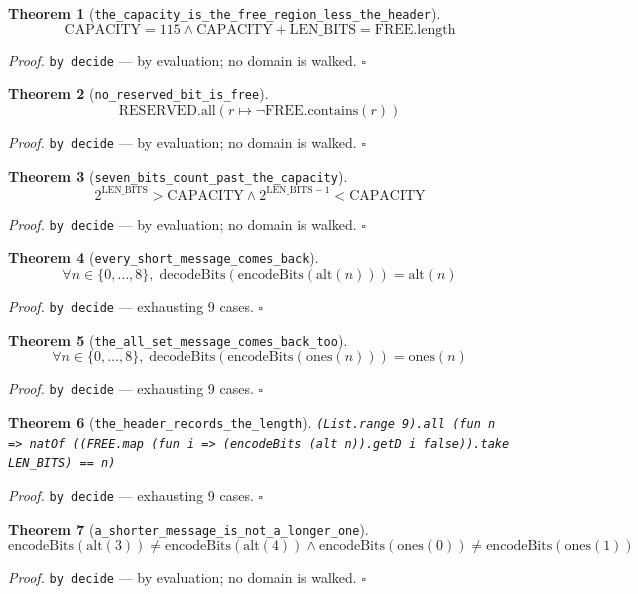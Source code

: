 \documentclass[11pt]{article}
\newtheorem{theorem}{Theorem}[section]
\begin{document}
\begin{theorem}[\texttt{the\_capacity\_is\_the\_free\_region\_less\_the\_header}]
\[ \mathrm{CAPACITY} = 115 \land \mathrm{CAPACITY} + \mathrm{LEN\_BITS} = \mathrm{FREE.length} \]
\end{theorem}
\noindent\emph{Proof.} \texttt{by decide} --- by evaluation; no domain is walked. \hfill$\square$

\begin{theorem}[\texttt{no\_reserved\_bit\_is\_free}]
\[ \mathrm{RESERVED.all}\mathopen{}\left(r \mapsto \lnot \mathrm{FREE.contains}\mathopen{}\left(r\right)\right) \]
\end{theorem}
\noindent\emph{Proof.} \texttt{by decide} --- by evaluation; no domain is walked. \hfill$\square$

\begin{theorem}[\texttt{seven\_bits\_count\_past\_the\_capacity}]
\[ 2^{\mathrm{LEN\_BITS}} > \mathrm{CAPACITY} \land 2^{\mathrm{LEN\_BITS} - 1} < \mathrm{CAPACITY} \]
\end{theorem}
\noindent\emph{Proof.} \texttt{by decide} --- by evaluation; no domain is walked. \hfill$\square$

\begin{theorem}[\texttt{every\_short\_message\_comes\_back}]
\[ \forall n \in \{0,\dots,8\},\; \mathrm{decodeBits}\mathopen{}\left(\mathrm{encodeBits}\mathopen{}\left(\mathrm{alt}\mathopen{}\left(n\right)\right)\right) = \mathrm{alt}\mathopen{}\left(n\right) \]
\end{theorem}
\noindent\emph{Proof.} \texttt{by decide} --- exhausting 9 cases. \hfill$\square$

\begin{theorem}[\texttt{the\_all\_set\_message\_comes\_back\_too}]
\[ \forall n \in \{0,\dots,8\},\; \mathrm{decodeBits}\mathopen{}\left(\mathrm{encodeBits}\mathopen{}\left(\mathrm{ones}\mathopen{}\left(n\right)\right)\right) = \mathrm{ones}\mathopen{}\left(n\right) \]
\end{theorem}
\noindent\emph{Proof.} \texttt{by decide} --- exhausting 9 cases. \hfill$\square$

\begin{theorem}[\texttt{the\_header\_records\_the\_length}]
\texttt{(List.range 9).all (fun n => natOf ((FREE.map (fun i => (encodeBits (alt n)).getD i false)).take LEN\_BITS) == n)}
\end{theorem}
\noindent\emph{Proof.} \texttt{by decide} --- exhausting 9 cases. \hfill$\square$

\begin{theorem}[\texttt{a\_shorter\_message\_is\_not\_a\_longer\_one}]
\[ \mathrm{encodeBits}\mathopen{}\left(\mathrm{alt}\mathopen{}\left(3\right)\right) \neq \mathrm{encodeBits}\mathopen{}\left(\mathrm{alt}\mathopen{}\left(4\right)\right) \land \mathrm{encodeBits}\mathopen{}\left(\mathrm{ones}\mathopen{}\left(0\right)\right) \neq \mathrm{encodeBits}\mathopen{}\left(\mathrm{ones}\mathopen{}\left(1\right)\right) \]
\end{theorem}
\noindent\emph{Proof.} \texttt{by decide} --- by evaluation; no domain is walked. \hfill$\square$
\end{document}
